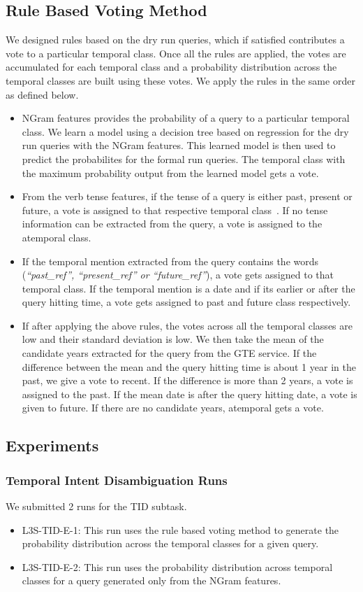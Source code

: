 \documentclass{sig-alternate}
\begin{document}
\subsection{Rule Based Voting Method}\label{sec:tid rules}
We designed rules based on the dry run queries, which if satisfied contributes a vote to a particular temporal class. Once all the rules are applied, the votes are accumulated for each temporal class and a probability distribution across the temporal classes are built using these votes. We apply the rules in the same order as defined below.
\begin{itemize}
\item \textsf{NGram features} provides the probability of a query to a particular temporal class. We learn a model using a decision tree based on regression for the dry run queries with the NGram features. This learned model is then used to predict the probabilites for the formal run queries. The temporal class with the maximum probability output from the learned model gets a vote.
\item From the \textsf{verb tense features}, if the tense of a query is either past, present or future, a vote is assigned to that respective temporal class~\cite{hitsz}. If no tense information can be extracted from the query, a vote is assigned to the atemporal class.
\item If the \textsf{temporal mention} extracted from the query contains the words (\textit{``past\_ref'', ``present\_ref'' or ``future\_ref''}), a vote gets assigned to that temporal class. If the temporal mention is a date and if its earlier or after the query hitting time, a vote gets assigned to past and future class respectively.
\item If after applying the above rules, the votes across all the temporal classes are low and their standard deviation is low. We then take the mean of the candidate years extracted for the query from the \textsf{GTE service}. If the difference between the mean and the query hitting time is about 1 year in the past, we give a vote to recent. If the difference is more than 2 years, a vote is assigned to the past. If the mean date is after the query hitting date, a vote is given to future. If there are no candidate years, atemporal gets a vote.
\end{itemize}
\subsection{Experiments}
\subsubsection{Temporal Intent Disambiguation Runs}
We submitted 2 runs for the TID subtask.
\begin{itemize}
\item \textsf{L3S-TID-E-1}: This run uses the \textsf{rule based voting method} to generate the probability distribution across the temporal classes for a given query.
\item \textsf{L3S-TID-E-2}: This run uses the probability distribution across temporal classes for a query generated only from the \textsf{NGram features}.
\end{itemize}
\end{document}
